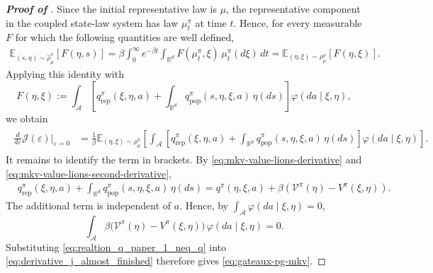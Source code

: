 \documentclass[a4paper, 10pt, english, reqno]{amsart}
\begin{document}
\begin{proof}[\textbf{Proof of }]
Since the initial representative law is $\mu$, the representative
component in the coupled state-law system has law $\mu_t^\pi$ at time
$t$. Hence, for every measurable $F$ for which the following quantities
are well defined,
\begin{align}\label{eq:rho-transfer-mkv}
\mathbb E_{(s,\eta)\sim\widehat\rho_\mu^\pi}[F(\eta,s)]
=
\beta\int_0^\infty e^{-\beta t}
\int_{\mathbb R^d}
F(\mu_t^\pi,\xi)\,\mu_t^\pi(d\xi)\,dt
=
\mathbb E_{(\eta,\xi)\sim\rho_\mu^\pi}[F(\eta,\xi)].
\end{align}
Applying this identity with
\[
F(\eta,\xi)
:=
\int_{\mathcal A}
\left[
q_{\mathrm{rep}}^\pi(\xi,\eta,a)
+
\int_{\mathbb R^d}
q_{\mathrm{pop}}^\pi(s,\eta,\xi,a)\,\eta(ds)
\right]
\varphi(da\mid \xi,\eta),
\]
we obtain
\begin{align}\label{eq:derivative_j_almost_finished}
    \begin{aligned}
\frac{d}{d\varepsilon}\mathcal J(\varepsilon)\bigg|_{\varepsilon=0}
&=\frac{1}{\beta}
\mathbb E_{(\eta,\xi)\sim\rho_\mu^\pi}\!\left[
\int_{\mathcal A}
\left[
q_{\mathrm{rep}}^\pi(\xi,\eta,a)
+
\int_{\mathbb R^d}
q_{\mathrm{pop}}^\pi(s,\eta,\xi,a)\,\eta(ds)
\right]
\varphi(da\mid \xi,\eta)
\right].
\end{aligned}
\end{align}
It remains to identify the term in brackets. By \eqref{eq:mkv-value-lions-derivative} and
\eqref{eq:mkv-value-lions-second-derivative},
\begin{align}\label{eq:realtion_q_paper_1_neq_q}
&q_{\mathrm{rep}}^\pi(\xi,\eta,a)
+\int_{\mathbb R^d}q_{\mathrm{pop}}^\pi(s,\eta,\xi,a)\,\eta(ds)=
q^\pi(\eta,\xi,a)
+\beta\left(
\mathcal V^\pi(\eta)-V^\pi(\xi,\eta)
\right).
\end{align}
The additional term is independent of $a$. Hence, by
$\int_{\mathcal A}\varphi(da\mid\xi,\eta)=0$,
\[
\int_{\mathcal A}
\beta\bigl(\mathcal V^\pi(\eta)-V^\pi(\xi,\eta)\bigr)
\,\varphi(da\mid\xi,\eta)=0.
\]
Substituting \eqref{eq:realtion_q_paper_1_neq_q} into
\eqref{eq:derivative_j_almost_finished} therefore gives
\eqref{eq:gateaux-pg-mkv}.
\end{proof}
\end{document}
